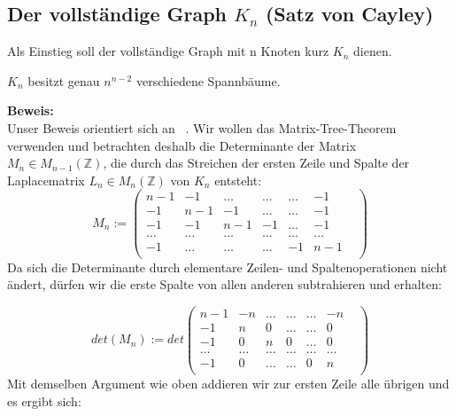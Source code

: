 \graphicspath{{grafiken/}}

\subsection{Der vollständige Graph $K_n$ (Satz von Cayley)}

Als Einstieg soll der vollständige Graph mit n Knoten kurz $K_n$ dienen.\\%
\begin{Tms}
$K_n$ besitzt genau $n^{n-2}$ verschiedene Spannbäume.\\
\end{Tms}
\textbf{Beweis:}\\
Unser Beweis orientiert sich an ~\cite{Lau_2004}.
Wir wollen das Matrix-Tree-Theorem verwenden und betrachten deshalb die Determinante der Matrix $M_n\in M_{n-1}(\mathbb{Z})$, die durch das Streichen der ersten Zeile und Spalte der Laplacematrix $L_n\in M_n(\mathbb{Z})$ von $K_n$ entsteht:
\begin{equation}
M_n:=
\begin{pmatrix}
n-1&-1&\ldots&\ldots&\ldots&-1\\
-1&n-1&-1&\ldots&\ldots&-1\\
-1&-1&n-1&-1&\ldots&-1\\
\ldots&\ldots&\ldots&\ldots&\ldots&\ldots&\\
-1&\ldots&\ldots&\ldots&-1&n-1\\
\end{pmatrix}
\end{equation}
Da sich die Determinante durch elementare Zeilen- und Spaltenoperationen nicht ändert, dürfen wir die erste Spalte von allen anderen subtrahieren und erhalten:

\begin{equation}
det(M_n):=det
\begin{pmatrix}
n-1&-n&\ldots&\ldots&\ldots&-n\\
-1&n&0&\ldots&\ldots&0\\
-1&0&n&0&\ldots&0\\
\ldots&\ldots&\ldots&\ldots&\ldots&\ldots&\\
-1&0&\ldots&\ldots&0&n\\
\end{pmatrix}
\end{equation}
Mit demselben Argument wie oben addieren wir zur ersten Zeile alle übrigen und es ergibt sich:

